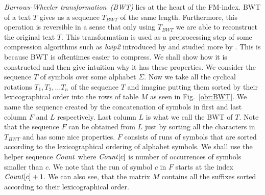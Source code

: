 \textit{Burrows-Wheeler transformation~(BWT)} lies at the heart of the FM-index.
BWT of a text $T$ gives us a sequence $\mathit{T_{BWT}}$ of the same length. Furthermore, this
operation is reversible in a sense that only using $\mathit{T_{BWT}}$ we are able to reconstruct
the original text $T$. This transformation is used as a preprocessing step of some compression
algorithms such as \textit{bzip2} introduced by \cite{seward1996bzip2} and studied more by
\cite{manzini2001analysis}. This is because
BWT is oftentimes easier to compress. We shall show how it is constructed and then give 
intuition why it has these properties. We consider the sequence $T$ of symbols over some
alphabet $\Sigma$. Now we take all the cyclical rotations $T_1, T_2, \ldots T_n$ of
the sequence $T$ and imagine putting them sorted by their lexicographical order into the
rows of table $M$ as seen in Fig.~\ref{obr:BWT}. We name the sequence created by the
concatenation of symbols in first and last column $F$ and $L$ respectively. Last column $L$
is what we call the BWT of $T$. Note that the sequence $F$ can be obtained from $L$ just by
sorting all the characters in $\mathit{T_{BWT}}$ and has some nice properties. $F$ consists of
runs of symbols that are sorted according to the lexicographical ordering of alphabet symbols.
We shall use the helper sequence $\mathit{Count}$ where $\mathit{Count}[c]$ is number of
occurrences of symbols smaller than $c$. We note that the run of symbol $c$ in $F$ starts at
the index $\mathit{Count}[c]+1$. We can also see, that the matrix $M$ contains all the suffixes
sorted according to their lexicographical order.

